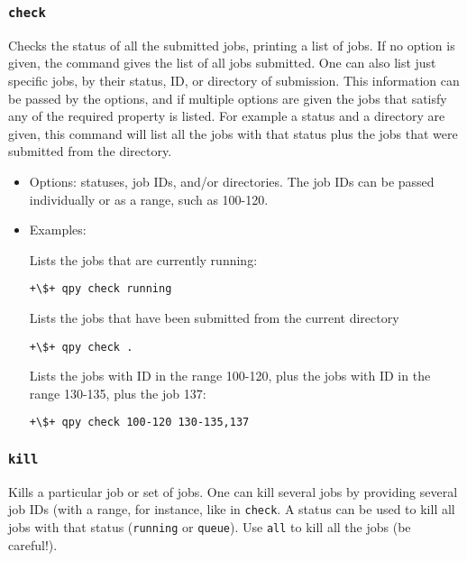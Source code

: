 \documentclass[a4paper,12pt]{article}
\begin{document}
\subsubsection{\texttt{check}}

Checks the status of all the submitted jobs, printing a list of jobs.
If no option is given, the command gives the list of all jobs submitted.
One can also list just specific jobs, by their status, ID, or directory of submission.
This information can be passed by the options, and if multiple options are given the jobs that satisfy any of the required property is listed.
For example a status and a directory are given, this command will list all the jobs with that status plus the jobs that were submitted from the directory.

\begin{itemize}
  
\item Options:
  statuses, job IDs, and/or directories.
  The job IDs can be passed individually or as a range, such as 100-120.
  
\item Examples:

  Lists the jobs that are currently running:

  \begin{lstlisting}[style=BashStyle]
+\$+ qpy check running
  \end{lstlisting}

  Lists the jobs that have been submitted from the current directory

  \begin{lstlisting}[style=BashStyle]
+\$+ qpy check .
  \end{lstlisting}

  Lists the jobs with ID in the range 100-120, plus the jobs with ID in the range 130-135, plus the job 137:

  \begin{lstlisting}[style=BashStyle]
+\$+ qpy check 100-120 130-135,137
  \end{lstlisting}
\end{itemize}

\subsubsection{\texttt{kill}}

Kills a particular job or set of jobs.
One can kill several jobs by providing several job IDs (with a range, for instance, like in \texttt{check}.
A status can be used to kill all jobs with that status (\texttt{running} or \texttt{queue}).
Use \texttt{all} to kill all the jobs (be careful!).
\end{document}
